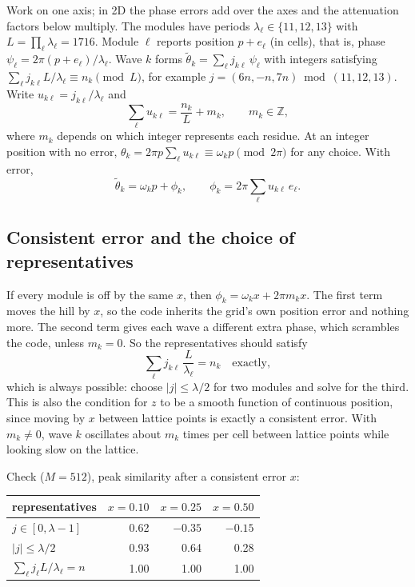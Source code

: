 \documentclass[11pt]{article}
\begin{document}
Work on one axis; in 2D the phase errors add over the axes and the attenuation factors below
multiply. The modules have periods $\lambda_\ell \in \{11, 12, 13\}$ with
$L = \prod_\ell\lambda_\ell = 1716$. Module $\ell$ reports position $p + e_\ell$ (in cells), that
is, phase $\psi_\ell = 2\pi(p + e_\ell)/\lambda_\ell$. Wave $k$ forms
$\tilde\theta_k = \sum_\ell j_{k\ell}\,\psi_\ell$ with integers satisfying
$\sum_\ell j_{k\ell}L/\lambda_\ell \equiv n_k \pmod L$, for example
$j = (6n, -n, 7n) \bmod (11, 12, 13)$. Write $u_{k\ell} = j_{k\ell}/\lambda_\ell$ and
\begin{equation}
  \sum_\ell u_{k\ell} = \frac{n_k}{L} + m_k, \qquad m_k \in \mathbb{Z},
\end{equation}
where $m_k$ depends on which integer represents each residue. At an integer position with no
error, $\theta_k = 2\pi p\sum_\ell u_{k\ell} \equiv \omega_k p \pmod{2\pi}$ for any choice. With
error,
\begin{equation}
  \tilde\theta_k = \omega_k p + \phi_k, \qquad \phi_k = 2\pi\sum_\ell u_{k\ell}\,e_\ell .
\end{equation}

\subsection{Consistent error and the choice of representatives}

If every module is off by the same $x$, then $\phi_k = \omega_k x + 2\pi m_k x$. The first term
moves the hill by $x$, so the code inherits the grid's own position error and nothing more. The
second term gives each wave a different extra phase, which scrambles the code, unless $m_k = 0$.
So the representatives should satisfy
\begin{equation}
  \sum_\ell j_{k\ell}\,\frac{L}{\lambda_\ell} = n_k \quad\text{exactly},
\end{equation}
which is always possible: choose $|j| \le \lambda/2$ for two modules and solve for the third. This
is also the condition for $z$ to be a smooth function of continuous position, since moving by
$x$ between lattice points is exactly a consistent error. With $m_k \ne 0$, wave $k$ oscillates
about $m_k$ times per cell between lattice points while looking slow on the lattice.

\noindent Check ($M = 512$), peak similarity after a consistent error $x$:
\begin{center}
\begin{tabular}{lrrr}
  \toprule
  representatives & $x = 0.10$ & $x = 0.25$ & $x = 0.50$ \\
  \midrule
  $j \in [0, \lambda-1]$ & 0.62 & $-0.35$ & $-0.15$ \\
  $|j| \le \lambda/2$ & 0.93 & 0.64 & 0.28 \\
  $\sum_\ell j_\ell L/\lambda_\ell = n$ & 1.00 & 1.00 & 1.00 \\
  \bottomrule
\end{tabular}
\end{center}
\end{document}
